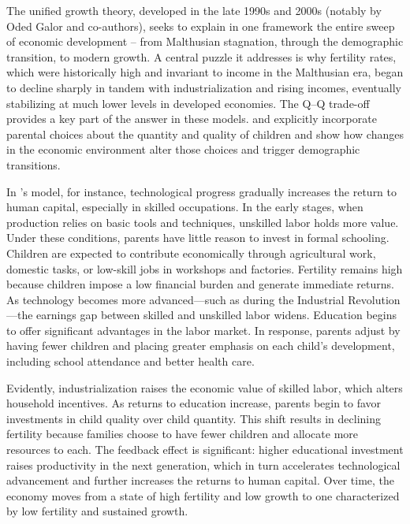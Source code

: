 \documentclass[]{AEA}
\begin{document}
The unified growth theory, developed in the late 1990s and 2000s
(notably by Oded Galor and co-authors), seeks to explain in one
framework the entire sweep of economic development -- from Malthusian
stagnation, through the demographic transition, to modern growth. A
central puzzle it addresses is why fertility rates, which were
historically high and invariant to income in the Malthusian era, began
to decline sharply in tandem with industrialization and rising incomes,
eventually stabilizing at much lower levels in developed economies. The
Q--Q trade-off provides a key part of the answer in these models.
\citet{galor2000population} and \citet{galor2002natural} explicitly
incorporate parental choices about the quantity and quality of children
and show how changes in the economic environment alter those choices and
trigger demographic transitions.

In \citet{galor2000population}'s model, for instance, technological
progress gradually increases the return to human capital, especially in
skilled occupations. In the early stages, when production relies on
basic tools and techniques, unskilled labor holds more value. Under
these conditions, parents have little reason to invest in formal
schooling. Children are expected to contribute economically through
agricultural work, domestic tasks, or low-skill jobs in workshops and
factories. Fertility remains high because children impose a low
financial burden and generate immediate returns. As technology becomes
more advanced---such as during the Industrial Revolution---the earnings
gap between skilled and unskilled labor widens. Education begins to
offer significant advantages in the labor market. In response, parents
adjust by having fewer children and placing greater emphasis on each
child's development, including school attendance and better health care.

Evidently, industrialization raises the economic value of skilled labor,
which alters household incentives. As returns to education increase,
parents begin to favor investments in child quality over child quantity.
This shift results in declining fertility because families choose to
have fewer children and allocate more resources to each. The feedback
effect is significant: higher educational investment raises productivity
in the next generation, which in turn accelerates technological
advancement and further increases the returns to human capital. Over
time, the economy moves from a state of high fertility and low growth to
one characterized by low fertility and sustained growth.
\end{document}
